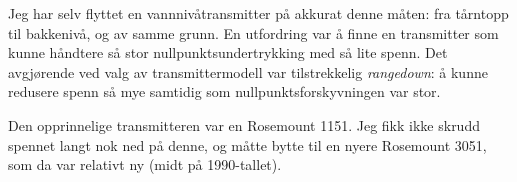 \vskip 10pt

Jeg har selv flyttet en vannnivåtransmitter på akkurat denne måten: fra tårntopp til bakkenivå, og av samme grunn.  En utfordring var å finne en transmitter som kunne håndtere så stor nullpunktsundertrykking med så lite spenn.  Det avgjørende ved valg av transmittermodell var tilstrekkelig \textit{rangedown}: å kunne redusere spenn så mye samtidig som nullpunktsforskyvningen var stor.

Den opprinnelige transmitteren var en Rosemount 1151.  Jeg fikk ikke skrudd spennet langt nok ned på denne, og måtte bytte til en nyere Rosemount 3051, som da var relativt ny (midt på 1990-tallet).


